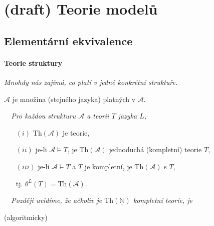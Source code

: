 \chapter{(draft) Teorie modelů}\label{chapter:model-theory}
\todo




\section{Elementární ekvivalence}\todo


\subsubsection*{Teorie struktury}

{\it Mnohdy nás zajímá, co platí v jedné konkrétní struktuře.}
\bigskip


 $\mathcal{A}$ je množina   (stejného jazyka) platných v $\mathcal{A}$.
\medskip

{\it {}\ \ Pro každou strukturu $\mathcal{A}$ a teorii $T$ jazyka $L$,
\smallskip

\begin{enumerate}
\item[$(i)$] $\mathrm{Th}(\mathcal{A})$ je  teorie,
\smallskip

\item[$(ii)$] je-li $\mathcal{A}\models T$, je $\mathrm{Th}(\mathcal{A})$ jednoduchá (kompletní)  teorie $T$,
\smallskip

\item[$(iii)$] je-li $\mathcal{A}\models T$ a $T$ je kompletní, je $\mathrm{Th}(\mathcal{A})$  s $T$,
\smallskip

tj. $\theta^L(T)=\mathrm{Th}(\mathcal{A})$.
\end{enumerate}}
\medskip

\bigskip

{\it {}\ \ Později uvidíme, že ačkoliv je $\mathrm{Th}(\underline{\mathbb{N}})$ kompletní teorie, je
\smallskip

(algoritmicky) }



